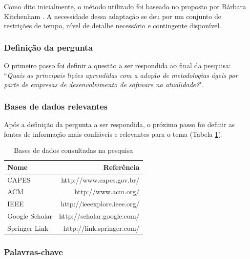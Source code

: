 Como dito inicialmente, o método utilizado foi baseado no proposto por Bárbara Kitchenham \cite{Barbara04}. A necessidade dessa adaptação se deu por um conjunto de restrições de tempo, nível de detalhe necessário e contingente disponível.

\subsubsection{Definição da pergunta}

O primeiro passo foi definir a questão a ser respondida ao final da pesquisa: ``\textit{Quais as principais lições aprendidas com a adoção de metodologias ágeis por parte de empresas de desenvolvimento de software na atualidade?}".

\subsubsection{Bases de dados relevantes}

Após a definição da pergunta a ser respondida, o próximo passo foi definir as fontes de informação mais confiáveis e relevantes para o tema (Tabela \ref{tab:basesDeDados}).

\begin{table}[H]
	\centering
	\begin{tabular}{| l | r |} \hline \textbf{Nome} & \textbf{Referência} \\ \hline
		CAPES & http://www.capes.gov.br/ \\ \hline
		ACM & http://www.acm.org/ \\ \hline
		IEEE & http://ieeexplore.ieee.org/ \\ \hline
		Google Scholar & http://scholar.google.com/ \\ \hline
		Springer Link & http://link.springer.com/ \\ \hline
	\end{tabular}
	\caption{Bases de dados consultadas na pesquisa}
	\label{tab:basesDeDados}
\end{table}

%
%
%

\subsubsection{Palavras-chave}

